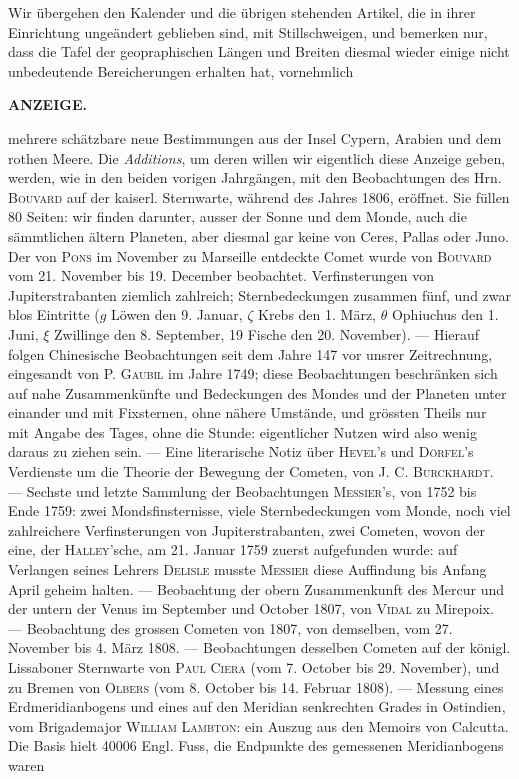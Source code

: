 Wir übergehen den Kalender und die übrigen stehenden Artikel, die in ihrer Einrichtung ungeändert geblieben sind, mit Stillschweigen, und bemerken nur, dass die Tafel der geopraphischen Längen und Breiten diesmal wieder einige nicht unbedeutende Bereicherungen erhalten hat, vornehmlich\par
\clearpage
\noindent{}%
%
\parbox[t]{\dimexpr\linewidth-24mm\relax}{\centering\footnotesize\bfseries ANZEIGE.\par}%
\makebox[12mm][r]{}\par\nobreak\medskip
\noindent mehrere schätzbare neue Bestimmungen aus der Insel Cypern, Arabien und dem rothen Meere. Die \emph{Additions}, um deren willen wir eigentlich diese Anzeige geben, werden, wie in den beiden vorigen Jahrgängen, mit den Beobachtungen des Hrn. \textsc{Bouvard} auf der kaiserl. Sternwarte, während des Jahres 1806, eröffnet. Sie füllen 80 Seiten: wir finden darunter, ausser der Sonne und dem Monde, auch die sämmtlichen ältern Planeten, aber diesmal gar keine von Ceres, Pallas oder Juno. Der von \textsc{Pons} im November zu Marseille entdeckte Comet wurde von \textsc{Bouvard} vom 21. November bis 19. December beobachtet. Verfinsterungen von Jupiterstrabanten ziemlich zahlreich; Sternbedeckungen zusammen fünf, und zwar blos Eintritte ($g$ Löwen den 9. Januar, $\zeta$ Krebs den 1. März, $\theta$ Ophiuchus den 1. Juni, $\xi$ Zwillinge den 8. September, 19 Fische den 20. November). — Hierauf folgen Chinesische Beobachtungen seit dem Jahre 147 vor unsrer Zeitrechnung, eingesandt von P. \textsc{Gaubil} im Jahre 1749; diese Beobachtungen beschränken sich auf nahe Zusammenkünfte und Bedeckungen des Mondes und der Planeten unter einander und mit Fixsternen, ohne nähere Umstände, und grössten Theils nur mit Angabe des Tages, ohne die Stunde: eigentlicher Nutzen wird also wenig daraus zu ziehen sein. — Eine literarische Notiz über \textsc{Hevel}'s und \textsc{Dörfel}'s Verdienste um die Theorie der Bewegung der Cometen, von \textsc{J. C. Burckhardt}. — Sechste und letzte Sammlung der Beobachtungen \textsc{Messier}'s, von 1752 bis Ende 1759: zwei Mondsfinsternisse, viele Sternbedeckungen vom Monde, noch viel zahlreichere Verfinsterungen von Jupiterstrabanten, zwei Cometen, wovon der eine, der \textsc{Halley}'sche, am 21. Januar 1759 zuerst aufgefunden wurde: auf Verlangen seines Lehrers \textsc{Delisle} musste \textsc{Messier} diese Auffindung bis Anfang April geheim halten. — Beobachtung der obern Zusammenkunft des Mercur und der untern der Venus im September und October 1807, von \textsc{Vidal} zu Mirepoix. — Beobachtung des grossen Cometen von 1807, von demselben, vom 27. November bis 4. März 1808. — Beobachtungen desselben Cometen auf der königl. Lissaboner Sternwarte von \textsc{Paul Ciera} (vom 7. October bis 29. November), und zu Bremen von \textsc{Olbers} (vom 8. October bis 14. Februar 1808). — Messung eines Erdmeridianbogens und eines auf den Meridian senkrechten Grades in Ostindien, vom Brigademajor \textsc{William Lambton}: ein Auszug aus den Memoirs von Calcutta. Die Basis hielt 40006 Engl. Fuss, die Endpunkte des gemessenen Meridianbogens waren

